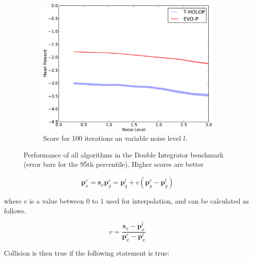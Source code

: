 \documentclass[conference]{IEEEtran}
\begin{document}
\begin{figure}[ht]
\begin{subfigure}[b]{0.32\textwidth}
                \label{fig:DI-N-50}
        \end{subfigure}   \begin{subfigure}[b]{0.32\textwidth}
                \centering
                \includegraphics[width=1.0\textwidth]{graphics/online-noise-DI_100-crop.pdf}
                \caption{Score for 100 iterations an variable noise level $l$.}
                \label{fig:DI-N-100}
        \end{subfigure}

  \label{fig:DI-all}

       \caption{Performance of all algorithms in the Double Integrator benchmark (error bars for the 95th percentile). Higher scores are better}


\end{figure}

\begin{equation}
\boldsymbol {p}_{x}^{c} = \boldsymbol {s}_{x}
\boldsymbol {p}_{y}^{c} = \boldsymbol {p}_{y}^{l} + v(\boldsymbol {p}_{y}^{r} - \boldsymbol {p}_{y}^{l})
\end{equation}

where $v$ is a value between $0$ to $1$ used for interpolation, and can be calculated as follows.

\begin{equation}
v = \frac{ {\boldsymbol {s}_{x} - \boldsymbol {p}_{x}^{l}}}{ {\boldsymbol {p}_{x}^{r} - \boldsymbol {p}_{x}^{l}} }
\end{equation}

Collision is then true if the following statement is true:
\end{document}
